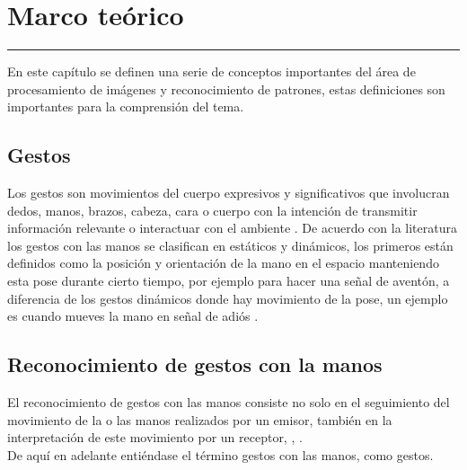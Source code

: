 \chapter{Marco te\'orico}\label{capit:cap2}
\vspace{-2.0325ex}%
\noindent
\rule{\textwidth}{0.5pt}
\vspace{-5.5ex}%
\newcommand{\pushline}{\Indp}%

En este capítulo se definen una serie de conceptos importantes del área de procesamiento de imágenes y reconocimiento de patrones, estas definiciones son importantes para la comprensión del tema.




\section{Gestos}\label{sec:2Gestos}
Los gestos son movimientos del cuerpo expresivos y significativos que involucran dedos, manos, brazos, cabeza, cara o cuerpo con la intención de transmitir información relevante o interactuar con el ambiente \citep{Mitra2007}.
De acuerdo con la literatura los gestos con las manos se clasifican en estáticos y dinámicos, los primeros están definidos como la posición y orientación de la mano en el espacio manteniendo esta pose durante cierto tiempo, por ejemplo para hacer una se\~nal de aventón, a diferencia de los gestos dinámicos donde hay movimiento de la pose, un ejemplo  es cuando mueves la mano en se\~nal de adiós \citep{Mitra2007}. 



\section{Reconocimiento de gestos con la manos}\label{sec:2ReconocimientoGestos}   

El reconocimiento de gestos con las manos consiste no solo en el seguimiento del movimiento de la o las manos realizados por un emisor, también en la interpretación de este movimiento por un receptor, \citep{Mitra2007}, \citep{Murthy2009}.\\
De aquí en adelante entiéndase el término gestos con las manos, como gestos.   


